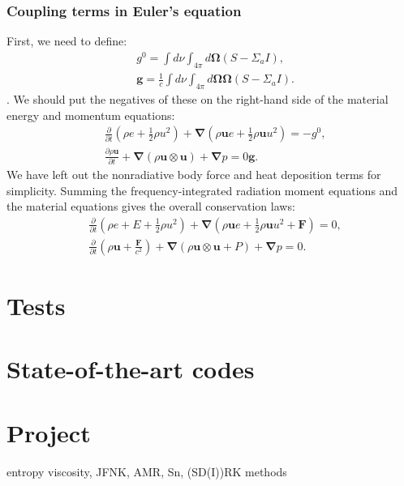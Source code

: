 \documentclass[letterpaper]{report}
\newcommand\bn{\boldsymbol{\nabla}}
\newcommand\bo{\boldsymbol{\Omega}}
\newcommand\bs{\boldsymbol}
\renewcommand{\(}{\left(}
\renewcommand{\)}{\right)}
\renewcommand{\[}{\left[}
\renewcommand{\]}{\right]}
\begin{document}
\subsection{Coupling terms in Euler's equation}
First, we need to define:
\begin{align}
  &g^0 = \int d\nu\int_{4\pi} d\bo (S-\Sigma_a I),\\
  &\bs{g} = \frac{1}{c}\int d\nu \int_{4\pi} d\bo \bo(S-\Sigma_a I).
\end{align}.
We should put the negatives of these on the right-hand side of the material
energy and momentum equations:
\begin{align}
  &\frac{\partial}{\partial t}\(\rho e + \frac{1}{2}\rho u^2\) + \bn \(\rho
  \bs{u} e + \frac{1}{2} \rho \bs{u}u^2\) = - g^0,\\
  & \frac{\partial \rho \bs{u}}{\partial t} + \bn(\rho\bs{u}\otimes\bs{u})+
  \bn p = 0\bs{g}.
\end{align}
We have left out the nonradiative body force and heat deposition terms for
simplicity. Summing the frequency-integrated radiation moment equations and
the material equations gives the overall conservation laws:
\begin{align}
  &\frac{\partial}{\partial t}\(\rho e + E + \frac{1}{2}\rho u^2\) + \bn \(\rho
  \bs{u} e + \frac{1}{2} \rho \bs{u}u^2 + \bs{F}\) = 0,\\
  & \frac{\partial}{\partial t}\(\rho \bs{u} + \frac{\bs{F}}{c^2}\) +
  \bn(\rho\bs{u}\otimes\bs{u}+ P) + \bn p = 0.
\end{align}


\chapter{Tests}

\chapter{State-of-the-art codes}

\chapter{Project}
entropy viscosity, JFNK, AMR, Sn, (SD(I))RK methods
\end{document}
